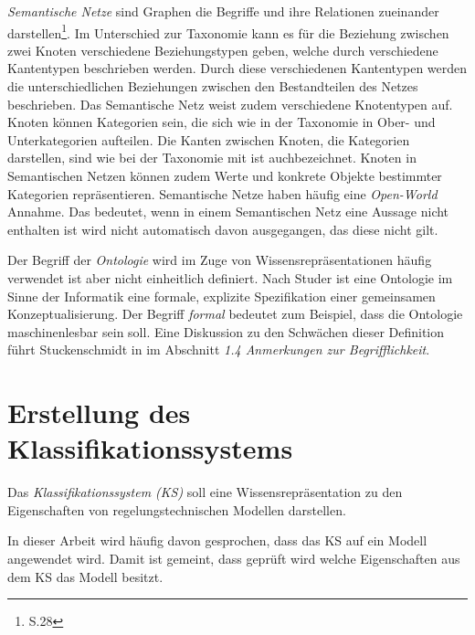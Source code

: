 \textit{Semantische Netze} \glqq sind Graphen die Begriffe und ihre Relationen zueinander darstellen\grqq\footnote{\cite{STU09} S.28}. Im Unterschied zur Taxonomie kann es für die Beziehung zwischen zwei Knoten verschiedene Beziehungstypen geben, welche durch verschiedene Kantentypen beschrieben werden. Durch diese verschiedenen Kantentypen werden die unterschiedlichen Beziehungen zwischen den Bestandteilen des Netzes beschrieben. Das Semantische Netz weist zudem verschiedene Knotentypen auf. Knoten können Kategorien sein, die sich wie in der Taxonomie in Ober- und Unterkategorien aufteilen. Die Kanten zwischen Knoten, die Kategorien darstellen, sind wie bei der Taxonomie mit \glqq ist auch\grqq bezeichnet. Knoten in Semantischen Netzen können zudem Werte und konkrete Objekte bestimmter Kategorien repräsentieren.
Semantische Netze haben häufig eine \textit{Open-World} Annahme. Das bedeutet, wenn in einem Semantischen Netz eine Aussage nicht enthalten ist wird nicht automatisch davon ausgegangen, das diese nicht gilt.

Der Begriff der \textit{Ontologie} wird im Zuge von Wissensrepräsentationen häufig verwendet ist aber nicht einheitlich definiert. Nach Studer \cite{STBEFE98} ist eine Ontologie im Sinne der Informatik eine \glqq formale, explizite Spezifikation einer gemeinsamen Konzeptualisierung\grqq. Der Begriff \textit{formal} bedeutet zum Beispiel, dass die Ontologie maschinenlesbar sein soll. Eine Diskussion zu den Schwächen dieser Definition führt Stuckenschmidt in \cite{STU09} im Abschnitt \textit{1.4 Anmerkungen zur Begrifflichkeit}. 

\section{Erstellung des Klassifikationssystems}
\label{Ch:Vorbetrachtung:Sec:KS}
Das \textit{Klassifikationssystem (KS)} soll eine Wissensrepräsentation zu den Eigenschaften von regelungstechnischen Modellen darstellen. 

In dieser Arbeit wird häufig davon gesprochen, dass das KS auf ein Modell angewendet wird. Damit ist gemeint, dass geprüft wird welche Eigenschaften aus dem KS das Modell besitzt. 

